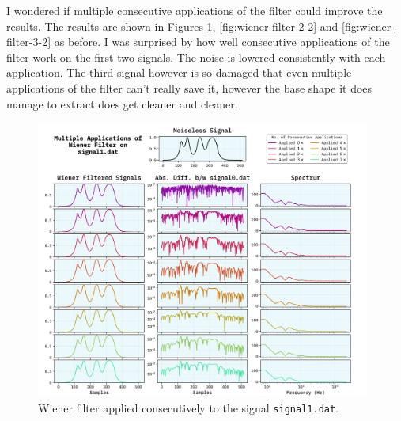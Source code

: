 \documentclass[10pt, titlepage, a4paper]{article}
\begin{document}
I wondered if multiple consecutive applications of the filter could improve the results. The results are shown in Figures
\ref{fig:wiener-filter-1-2}, \ref{fig:wiener-filter-2-2} and \ref{fig:wiener-filter-3-2} as before. I was surprised by 
how well consecutive applications of the filter work on the first two signals. The noise is lowered consistently with 
each application. The third signal however is so damaged that even multiple applications of the filter can't really 
save it, however the base shape it does manage to extract does get cleaner and cleaner. \\

\begin{figure}[p]
    \centering
    \includegraphics[width=0.98\textwidth]{../WienerFilter/Images/multiple-signal1.dat.png}
    \caption{Wiener filter applied consecutively to the signal \texttt{signal1.dat}.}
    \label{fig:wiener-filter-1-2}
\end{figure}
\end{document}
